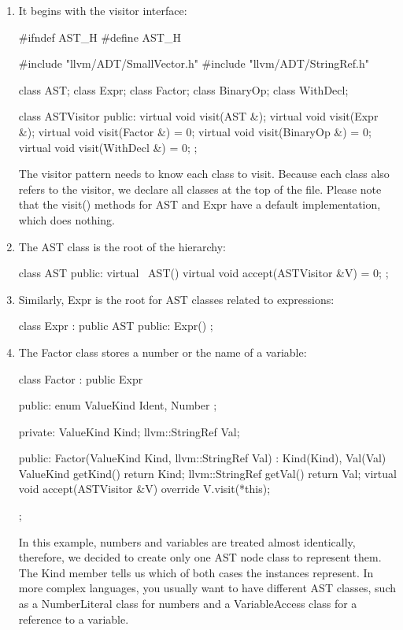 \begin{enumerate}
\item
It begins with the visitor interface:

\begin{cpp}
#ifndef AST_H
#define AST_H

#include "llvm/ADT/SmallVector.h"
#include "llvm/ADT/StringRef.h"

class AST;
class Expr;
class Factor;
class BinaryOp;
class WithDecl;

class ASTVisitor {
    public:
    virtual void visit(AST &){};
    virtual void visit(Expr &){};
    virtual void visit(Factor &) = 0;
    virtual void visit(BinaryOp &) = 0;
    virtual void visit(WithDecl &) = 0;
};
\end{cpp}

The visitor pattern needs to know each class to visit. Because each class also refers to the visitor, we declare all classes at the top of the file. Please note that the visit() methods for AST and Expr have a default implementation, which does nothing.

\item
The AST class is the root of the hierarchy:

\begin{cpp}
class AST {
public:
    virtual ~AST() {}
    virtual void accept(ASTVisitor &V) = 0;
};
\end{cpp}

\item
Similarly, Expr is the root for AST classes related to expressions:

\begin{cpp}
class Expr : public AST {
public:
    Expr() {}
};
\end{cpp}

\item
The Factor class stores a number or the name of a variable:

\begin{cpp}
class Factor : public Expr {
public:
    enum ValueKind { Ident, Number };

private:
    ValueKind Kind;
    llvm::StringRef Val;

public:
    Factor(ValueKind Kind, llvm::StringRef Val)
        : Kind(Kind), Val(Val) {}
    ValueKind getKind() { return Kind; }
    llvm::StringRef getVal() { return Val; }
    virtual void accept(ASTVisitor &V) override {
        V.visit(*this);
    }
};
\end{cpp}

In this example, numbers and variables are treated almost identically, therefore, we decided to create only one AST node class to represent them. The Kind member tells us which of both cases the instances represent. In more complex languages, you usually want to have different AST classes, such as a NumberLiteral class for numbers and a VariableAccess class for a reference to a variable.


\end{enumerate}
